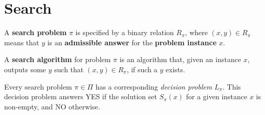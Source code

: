 \chapter{Search}

\begin{defn}\label{search_problem}
    A \textbf{search problem} \(\pi\) is specified by a binary relation \( R_\pi \), where \((x,y) \in R_\pi\) means that \( y \) is an \textbf{admissible answer} for the \textbf{problem instance} \( x \).
\end{defn}

\begin{defn}\label{search_algorithm}
    A \textbf{search algorithm} for problem \(\pi\) is an algorithm that, given an instance \( x \), outputs some \( y \) such that \((x,y) \in R_\pi\), if such a \( y \) exists.
\end{defn}

\begin{remark}
    Every search problem \(\pi \in \Pi\) has a corresponding \emph{decision problem} \(L_\pi\). This decision problem answers YES if the solution set \(S_{\pi}(x)\) for a given instance \(x\) is non-empty, and NO otherwise.
\end{remark}

